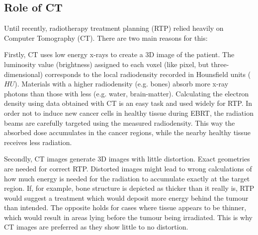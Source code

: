 \clearpage
\subsection{Role of CT}
Until recently, radiotherapy treatment planning (RTP) relied heavily on Computer Tomography (CT).
There are two main reasons for this:

Firstly, CT uses low energy x-rays to create a 3D image of the patient.
The luminosity value (brightness) assigned to each voxel (like pixel, but three-dimensional) corresponds to the local radiodensity recorded in Hounsfield units ($HU$).
Materials with a higher radiodensity (e.g. bones) absorb more x-ray photons than those with less (e.g. water, brain-matter).
Calculating the electron density using data obtained with CT is an easy task and used widely for RTP. \cite{Constantinou2012, Schneider1996}
In order not to induce new cancer cells in healthy tissue during EBRT, the radiation beams are carefully targeted using the measured radiodensity. 
This way the absorbed dose accumulates in the cancer regions, while the nearby healthy tissue receives less radiation.

Secondly, CT images generate 3D images with little distortion. Exact geometries are needed for correct RTP.
Distorted images might lead to wrong calculations of how much energy is needed for the radiation to accumulate exactly at the target region.
If, for example, bone structure is depicted as thicker than it really is, RTP would suggest a treatment which would deposit more energy behind the tumour than intended. The opposite holds for cases where tissue appears to be thinner, which would result in areas lying before the tumour being irradiated.
This is why CT images are preferred as they show little to no distortion.


